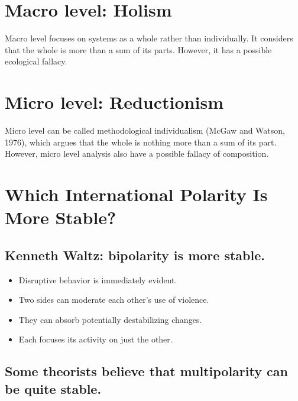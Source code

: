 \documentclass[
]{book}
\begin{document}
\hypertarget{macro-level-holism}{%
\section{Macro level: Holism}\label{macro-level-holism}}

Macro level focuses on systems as a whole rather than individually. It considers that the whole is more than a sum of its parts. However, it has a possible ecological fallacy.

\hypertarget{micro-level-reductionism}{%
\section{Micro level: Reductionism}\label{micro-level-reductionism}}

Micro level can be called methodological individualism (McGaw and Watson, 1976), which argues that the whole is nothing more than a sum of its part. However, micro level analysis also have a possible fallacy of composition.

\hypertarget{which-international-polarity-is-more-stable}{%
\section{Which International Polarity Is More Stable?}\label{which-international-polarity-is-more-stable}}

\hypertarget{kenneth-waltz-bipolarity-is-more-stable.}{%
\subsection{Kenneth Waltz: bipolarity is more stable.}\label{kenneth-waltz-bipolarity-is-more-stable.}}

\begin{itemize}
\item
  Disruptive behavior is immediately evident.
\item
  Two sides can moderate each other's use of violence.
\item
  They can absorb potentially destabilizing changes.
\item
  Each focuses its activity on just the other.
\end{itemize}

\hypertarget{some-theorists-believe-that-multipolarity-can-be-quite-stable.}{%
\subsection{Some theorists believe that multipolarity can be quite stable.}\label{some-theorists-believe-that-multipolarity-can-be-quite-stable.}}
\end{document}
